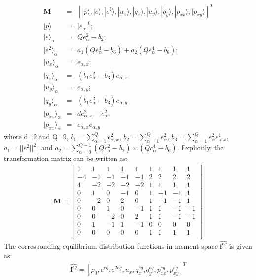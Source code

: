 \begin{align}
\mathbf{M} & = & \left[|p\rangle,|e\rangle,|e^2\rangle,|u_x\rangle,|q_x\rangle,|u_y\rangle,|q_y\rangle,|p_{xx}\rangle,|p_{xy}\rangle\right]^T \\
|p\rangle & = & |\mathit{e}_{\alpha}|^0;\\
|e\rangle_{\alpha} & = & \mathit{Q}e_{\alpha}^2-b_2;\\
|e^2\rangle_{\alpha} & = & a_1(\mathit{Q}e_{\alpha}^4-b_6)+a_2(\mathit{Q}e_{\alpha}^4-b_6);\\
|u_x\rangle_{\alpha} & = & e_{\alpha,x}; \\
|q_x\rangle_{\alpha} & = & (\mathit{b}_1e_{\alpha}^2-b_3)e_{\alpha,x}\\
|u_y\rangle_{\alpha} & = & e_{\alpha,y}; \\
|q_y\rangle_{\alpha} & = & (\mathit{b}_1e_{\alpha}^2-b_3)e_{\alpha,y}\\
|p_{xx}\rangle_{\alpha} & = & \mathit{d}e_{\alpha,x}^2-e_{\alpha}^2; \\
|p_{xx}\rangle_{\alpha}  & = & e_{\alpha,x}e_{\alpha,y}
\end{align}
\noindent where d=2 and Q=9, $b_1=\sum_{\alpha=1}^{Q}e_{\alpha,x}^2$, $b_2=\sum_{\alpha=1}^{Q}e_{\alpha}^2$, 
$b_3=\sum_{\alpha=1}^{Q}e_{\alpha}^2e_{\alpha,x}^4$, $a_1=||e^2||^2,$ and $a_2=\sum_{\alpha=0}^{Q-1}(Qc_{\alpha}^2-b_2)\times(Qc_{\alpha}^4-b_6)$. Explicitly, the transformation matrix can be written as:
\begin{align}
\mathbf{M}= \begin{bmatrix}
 1 &  1 &  1 &  1 &  1 &  1 &  1 &  1 &  1 \\
-4 & -1 & -1 & -1 & -1 &  2 &  2 &  2 &  2 \\ 
 4 & -2 & -2 & -2 & -2 &  1 &  1 &  1 &  1 \\
 0 &  1 &  0 & -1 &  0 &  1 & -1 & -1 &  1 \\
 0 & -2 &  0 &  2 &  0 &  1 & -1 & -1 &  1 \\
 0 &  0 &  1 &  0 & -1 &  1 &  1 & -1 & -1 \\
 0 &  0 & -2 &  0 &  2 &  1 &  1 & -1 & -1 \\
 0 &  1 & -1 &  1 & -1 &  0 &  0 &  0 &  0 \\
 0 &  0 &  0 &  0 &  0 &  1 &  1 &  1 &  1 \\
\end{bmatrix}
\end{align}
The corresponding equilibrium distribution functions in moment space $\widehat{\mathbf{f}^{eq}}$ is given as:
\begin{align}
\widehat{\mathbf{f}^{eq}}=\left[\rho_0,e^{eq},e^{2eq},u_x,q_x^{eq},q_y^{eq},p_{xx}^{eq},p_{xy}^{eq}\right]^T
\end{align}
